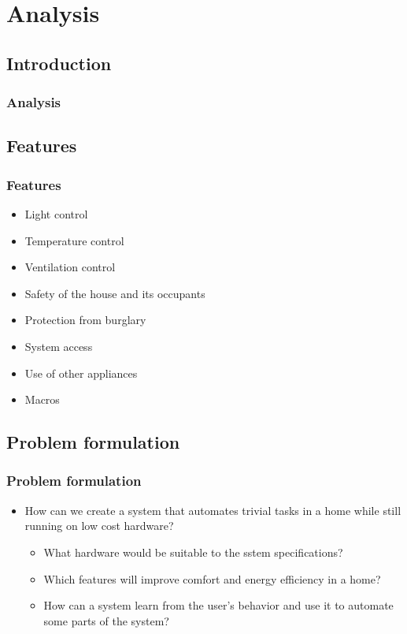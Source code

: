 \section{Analysis}
\subsection{Introduction}
\begin{frame}
	\frametitle{Analysis}	
\end{frame}

\subsection{Features}

\begin{frame}
  \begin{center}
    \frametitle{Features}
    	\begin{itemize}
			\item Light control
			\item Temperature control
			\item Ventilation control
			\item Safety of the house and its occupants
			\item Protection from burglary
			\item System access
			\item Use of other appliances
			\item Macros
		\end{itemize}
			
  \end{center}
\end{frame}

\subsection{Problem formulation}

\begin{frame}
  \begin{center}
    \frametitle{Problem formulation}
    	\begin{itemize}
    		\item How can we create a system that automates trivial tasks in a home while still running on low cost hardware?
    			\begin{itemize}
    				\item What hardware would be suitable to the sstem specifications?
    				\item Which features will improve comfort and energy efficiency in a home?
    				\item How can a system learn from the user's behavior and use it to automate some parts of the system?
    			\end{itemize}
    	\end{itemize}
  \end{center}
\end{frame}

